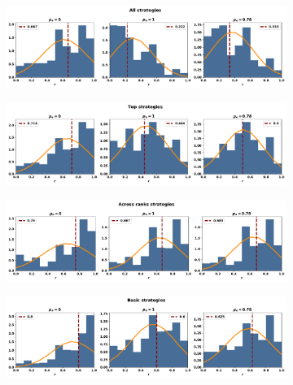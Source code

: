 \begin{figure}[!htbp]
    \begin{subfigure}{\textwidth}
    \includegraphics[width=\textwidth]{src/chapters/07/img/normalised_rank_all_strategies.pdf}
    \end{subfigure}
    \par\bigskip
    \begin{subfigure}{\textwidth}
    \includegraphics[width=\textwidth]{src/chapters/07/img/normalised_rank_top_strategies.pdf}
    \end{subfigure}
    \par\bigskip
    \begin{subfigure}{\textwidth}
    \includegraphics[width=\textwidth]{src/chapters/07/img/normalised_rank_across_ranks_strategies.pdf}
    \end{subfigure}
    \par\bigskip
    \begin{subfigure}{\textwidth}
    \includegraphics[width=\textwidth]{src/chapters/07/img/normalised_rank_basic_strategies.pdf}
    \end{subfigure}
\end{figure}


